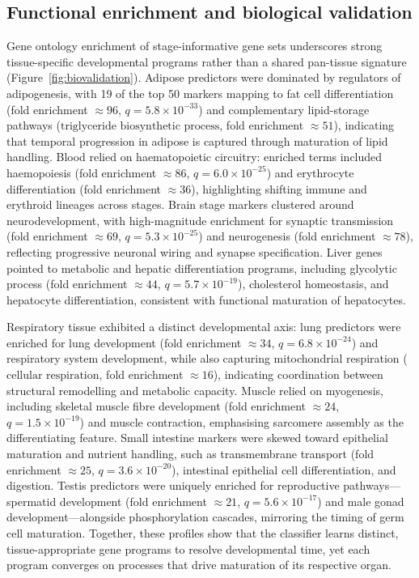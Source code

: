 \documentclass[11pt]{article}
\begin{document}
\subsection{Functional enrichment and biological validation}
Gene ontology enrichment of stage-informative gene sets underscores strong tissue-specific developmental programs rather than a shared pan-tissue signature (Figure~\ref{fig:biovalidation}). Adipose predictors were dominated by regulators of adipogenesis, with 19 of the top 50 markers mapping to fat cell differentiation (fold enrichment $\approx 96$, $q = 5.8 \times 10^{-33}$) and complementary lipid-storage pathways ($\text{triglyceride biosynthetic process}$, fold enrichment $\approx 51$), indicating that temporal progression in adipose is captured through maturation of lipid handling. Blood relied on haematopoietic circuitry: enriched terms included haemopoiesis (fold enrichment $\approx 86$, $q = 6.0 \times 10^{-25}$) and erythrocyte differentiation (fold enrichment $\approx 36$), highlighting shifting immune and erythroid lineages across stages. Brain stage markers clustered around neurodevelopment, with high-magnitude enrichment for synaptic transmission (fold enrichment $\approx 69$, $q = 5.3 \times 10^{-25}$) and neurogenesis (fold enrichment $\approx 78$), reflecting progressive neuronal wiring and synapse specification. Liver genes pointed to metabolic and hepatic differentiation programs, including glycolytic process (fold enrichment $\approx 44$, $q = 5.7 \times 10^{-19}$), cholesterol homeostasis, and hepatocyte differentiation, consistent with functional maturation of hepatocytes.

Respiratory tissue exhibited a distinct developmental axis: lung predictors were enriched for lung development (fold enrichment $\approx 34$, $q = 6.8 \times 10^{-24}$) and respiratory system development, while also capturing mitochondrial respiration ($\text{cellular respiration}$, fold enrichment $\approx 16$), indicating coordination between structural remodelling and metabolic capacity. Muscle relied on myogenesis, including skeletal muscle fibre development (fold enrichment $\approx 24$, $q = 1.5 \times 10^{-19}$) and muscle contraction, emphasising sarcomere assembly as the differentiating feature. Small intestine markers were skewed toward epithelial maturation and nutrient handling, such as transmembrane transport (fold enrichment $\approx 25$, $q = 3.6 \times 10^{-20}$), intestinal epithelial cell differentiation, and digestion. Testis predictors were uniquely enriched for reproductive pathways---spermatid development (fold enrichment $\approx 21$, $q = 5.6 \times 10^{-17}$) and male gonad development---alongside phosphorylation cascades, mirroring the timing of germ cell maturation. Together, these profiles show that the classifier learns distinct, tissue-appropriate gene programs to resolve developmental time, yet each program converges on processes that drive maturation of its respective organ.
\end{document}
